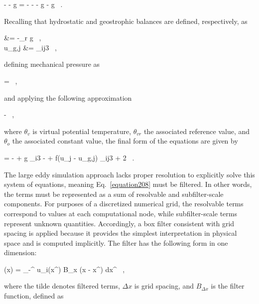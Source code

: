 \be
-   -  g = -   -   -   g -  g \, .
\label{equation204}
\ee


\noindent Recalling that hydrostatic and geostrophic balances are defined, respectively, as


\bse \label{equation205}
\bal
{} &= -\rho_r g \, , \label{equation205a}\\
u_{g,j} &= \epsilon_{ij3}    \label{equation205b} \, ,
\eal
\ese


\noindent defining mechanical pressure as

\be
\pi =  \, ,
\label{equation206}
\ee

\noindent and applying the following approximation


\be
- \approx {} \, ,
\label{equation207}
\ee


\noindent where $\theta_v$ is virtual potential temperature, $\theta_{vr}$ the associated reference value, and $\theta_o$ the associated constant value, the final form of the equations are given by

 
\be
{} = - + g  \delta_{i3} -  + f(u_j - u_{g,j}) \epsilon_{ij3} + 2 \nu {} \, .
\label{equation208}
\ee


The large eddy simulation approach lacks proper resolution to explicitly solve this system of equations, meaning Eq.~\eqref{equation208} must be filtered. In other words, the terms must be represented as a sum of resolvable and subfilter-scale components. For purposes of a discretized numerical grid, the resolvable terms correspond to values at each computational node, while subfilter-scale terms represent unknown quantities. Accordingly, a box filter consistent with grid spacing is applied because it provides the simplest interpretation in physical space and is computed implicitly. The filter has the following form in one dimension:


\be
{}(x) = \int_{-\infty}^{\infty} u_i(x^{\prime}) B_{\Delta x} (x - x^{\prime}) dx^{\prime} \, ,
\label{equation209}
\ee


\noindent where the tilde denotes filtered terms, $\Delta x$ is grid spacing, and $B_{\Delta x}$ is the filter function, defined as


